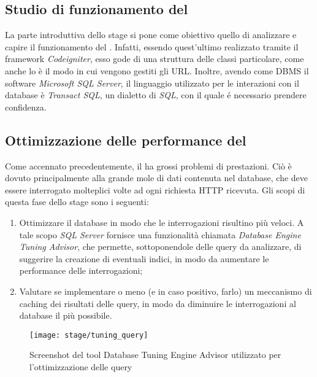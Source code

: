 \subsection{Studio di funzionamento del \bookingEngine}
La parte introduttiva dello stage si pone come obiettivo quello di analizzare e capire il funzionamento del \bookingEngine. Infatti, essendo quest'ultimo realizzato tramite il \gls{framework} \textit{Codeigniter}, esso gode di una struttura delle classi particolare, come anche lo è il modo in cui vengono gestiti gli URL. Inoltre, avendo come \gls{DBMS} il software \textit{Microsoft SQL Server}, il linguaggio utilizzato per le interazioni con il database è \textit{Transact SQL}, un dialetto di \textit{SQL}, con il quale é necessario prendere confidenza.

\subsection{Ottimizzazione delle performance del \bookingEngine}
Come accennato precedentemente, il \bookingEngine ha grossi problemi di prestazioni. Ciò è dovuto principalmente alla grande mole di dati contenuta nel database, che deve essere interrogato molteplici volte ad ogni richiesta HTTP ricevuta. Gli scopi di questa fase dello stage sono i seguenti:
\begin{enumerate}
	\item Ottimizzare il database in modo che le interrogazioni risultino più veloci. A tale scopo \textit{SQL Server} fornisce una funzionalità chiamata \textit{Database Engine Tuning Advisor}, che permette, sottoponendole delle query da analizzare, di suggerire la creazione di eventuali indici, in modo da aumentare le performance delle interrogazioni;
	\item Valutare se implementare o meno (e in caso positivo, farlo) un meccanismo di caching dei risultati delle query, in modo da diminuire le interrogazioni al database il più possibile.
\end{enumerate}

\begin{figure}[!h] 
	\centering 
	\texttt{[image: stage/tuning\_query]} 
	\caption{Screenshot del tool Database Tuning Engine Advisor utilizzato per l'ottimizzazione delle query}
\end{figure}

